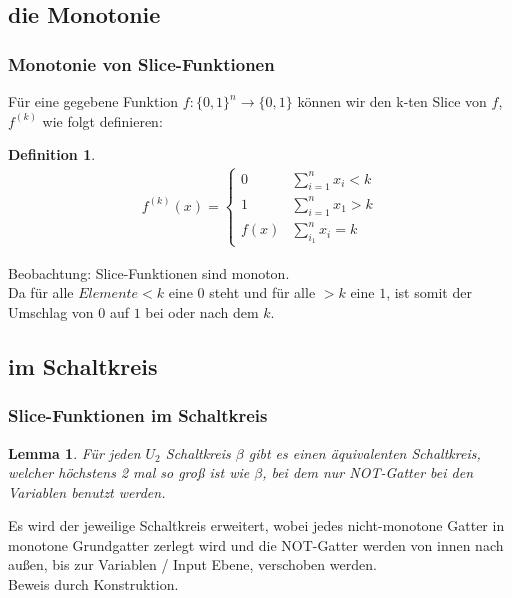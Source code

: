 \documentclass[hyperref={pdfpagelabels=false}]{beamer} %
\newtheorem{defin}{Definition}
\newtheorem{lem}{Lemma}
\begin{document}
  \subsection*{die Monotonie}
  \begin{frame}
    \frametitle{Monotonie von Slice-Funktionen}
    Für eine gegebene Funktion $f:\{0,1\}^n \rightarrow \{0,1\}$ können wir den k-ten Slice von $f$,
    $f^{(k)}$ wie folgt definieren:\\
    \begin{defin}
      \begin{align*}
        f^{(k)}(x) =
        \begin{cases}
          0 & \sum\nolimits_{i=1}^{n} x_i < k\\
          1 & \sum\nolimits_{i=1}^{n} x_1 > k\\
          f(x) &\sum\nolimits_{i_1}^{n} x_i = k
        \end{cases}
      \end{align*}
    \end{defin}
    Beobachtung: Slice-Funktionen sind monoton.\\
    Da für alle $Elemente < k$ eine $0$ steht und für alle $> k$ eine $1$, ist somit der Umschlag von $0$ auf $1$ bei oder nach dem $k$.
  \end{frame}

  \subsection{im Schaltkreis}
  \begin{frame}%
    \frametitle{Slice-Funktionen im Schaltkreis}
    \begin{lem}
      Für jeden $U_2$ Schaltkreis $\beta$ gibt es einen äquivalenten Schaltkreis, welcher höchstens
      2 mal so groß ist wie $\beta$, bei dem nur NOT-Gatter bei den Variablen benutzt werden. %
    \end{lem}
    Es wird der jeweilige Schaltkreis erweitert, wobei jedes nicht-monotone Gatter in monotone Grundgatter zerlegt wird und die NOT-Gatter werden von innen nach außen, bis zur Variablen / Input Ebene, verschoben werden.
    \\Beweis durch Konstruktion.
  \end{frame}
\end{document}
